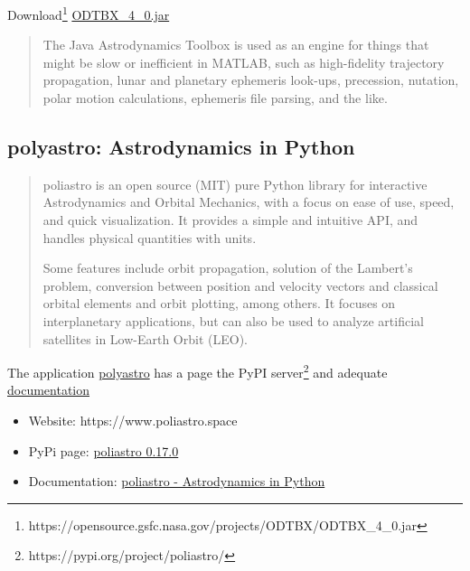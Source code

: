 \documentclass[a4paper,10pt]{article}
\begin{document}
Download\footnote{https://opensource.gsfc.nasa.gov/projects/ODTBX/ODTBX\_4\_0.jar} \href{https://opensource.gsfc.nasa.gov/projects/ODTBX/ODTBX_4_0.jar}{ODTBX\_4\_0.jar}

\begin{quotation}
The Java
Astrodynamics Toolbox is used as an engine for things that might be slow or inefficient in MATLAB, such as high-fidelity trajectory propagation, lunar and planetary ephemeris look-ups, precession, nutation, polar motion calculations, ephemeris file parsing, and the like.
\end{quotation}

\subsection{polyastro: Astrodynamics in Python}
\begin{quotation}
poliastro is an open source (MIT) pure Python library for interactive Astrodynamics and Orbital Mechanics, with a focus on ease of use, speed, and quick visualization. It provides a simple and intuitive API, and handles physical quantities with units.

Some features include orbit propagation, solution of the Lambert's problem, conversion between position and velocity vectors and classical orbital elements and orbit plotting, among others. It focuses on interplanetary applications, but can also be used to analyze artificial satellites in Low-Earth Orbit (LEO).
\end{quotation}

The application \href{https://pypi.org/project/poliastro/}{polyastro} has a page the PyPI server\footnote{https://pypi.org/project/poliastro/} and adequate \href{https://docs.poliastro.space/en/stable/}{documentation}

\begin{itemize}
	\item Website: https://www.poliastro.space
	\item PyPi page: \href{https://pypi.org/project/poliastro/}{poliastro 0.17.0}
	\item Documentation: \href{https://docs.poliastro.space/en/stable/}{poliastro - Astrodynamics in Python}
\end{itemize}


\end{document}
